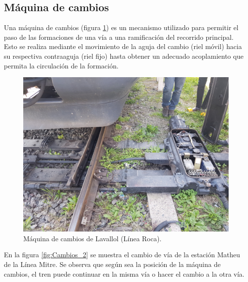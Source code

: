 		\subsection{Máquina de cambios}
			
			Una máquina de cambios (figura \ref{fig:Cambio}) es un mecanismo utilizado para permitir el paso de las formaciones de una vía a una ramificación del recorrido principal. Esto se realiza mediante el movimiento de la aguja del cambio (riel móvil) hacia su respectiva contraaguja (riel fijo) hasta obtener un adecuado acoplamiento que permita la circulación de la formación.
			
			\begin{figure}[h!]
				\centering
				\includegraphics[scale=.06]{./Figures/Cambio}
				\caption{Máquina de cambios de Lavallol (Línea Roca).}
				\label{fig:Cambio}
			\end{figure} 
			
			\vspace{7cm}
			
			En la figura \ref{fig:Cambios_2} se muestra el cambio de vía de la estación Matheu de la Línea Mitre. Se observa que según sea la posición de la máquina de cambios, el tren puede continuar en la misma vía o hacer el cambio a la otra vía.
			
